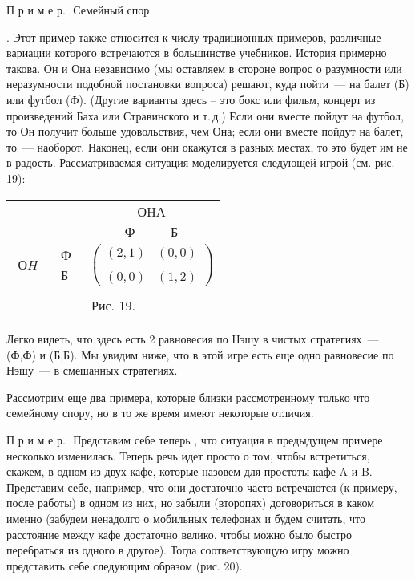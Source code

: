 П р и м е р.\,\,  Семейный спор{. Этот пример также относится к
числу традиционных примеров, различные вариации которого встречаются
в большинстве учебников. История примерно такова. Он и Она
независимо (мы оставляем в стороне вопрос о разумности или
неразумности подобной постановки вопроса) решают, куда пойти~--- на
балет (Б) или  футбол (Ф). (Другие варианты здесь -- это бокс или
фильм, концерт из произведений Баха или Стравинского и т.\,д.) Если
они вместе пойдут на футбол, то Он получит больше удовольствия, чем
Она; если они вместе пойдут на балет, то~--- наоборот. Наконец, если
они окажутся в разных местах, то это будет им не в радость.
Рассматриваемая ситуация моделируется следующей игрой (см.
рис.\,19):

\begin{center}
\begin{tabular}{ccc}
&&ОHА\\
&&$\begin{array}{cc} Ф\quad&\quad Б\end{array}$\\
$\begin{array}{c} \\ ОH\\ \end{array}$& $\begin{array}{c} Ф\\ \\
Б\end{array}$& $\left(\begin{array}{cc}
(2,1)&(0,0)\\
\\
(0,0)&(1,2)\end{array}\right) $\\
\multicolumn{3}{c}{}\\
\multicolumn{3}{c}{Рис. 19.}\\
\end{tabular}
\end{center}

Легко видеть, что здесь есть 2 равновесия по Нэшу в чистых
стратегиях~--- (Ф,Ф) и (Б,Б). Мы увидим ниже, что в этой игре есть
еще одно равновесие по Нэшу~--- в смешанных стратегиях.
\smallskip

Рассмотрим еще два примера, которые близки рассмотренному только что
семейному спору, но в то же время имеют некоторые отличия.

П р и м е р.\,\, Представим себе теперь , что ситуация в предыдущем
примере несколько изменилась. Теперь речь идет просто о том, чтобы
встретиться, скажем, в одном из двух кафе, которые назовем для
простоты кафе A и B. Представим себе, например, что они достаточно
часто встречаются (к примеру, после работы) в одном из них, но
забыли (второпях) договориться в каком именно (забудем ненадолго о
мобильных телефонах и будем считать, что расстояние между кафе
достаточно велико, чтобы можно было быстро перебраться из одного в
другое). Тогда соответствующую игру можно представить себе следующим
образом (рис. 20).

}
